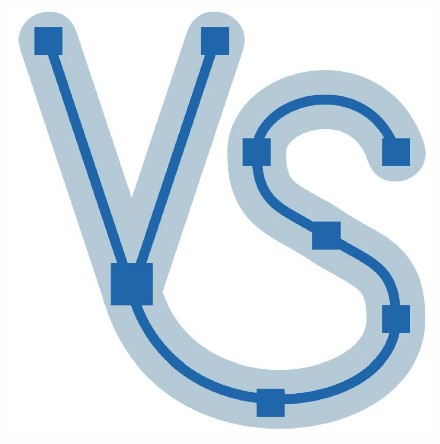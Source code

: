 \begin{titlepage}
\begin{figure}[h]
\begin{minipage}{0.2\textwidth}
\includegraphics[width=1.0\textwidth]{images/vs_logo.jpg}
\end{minipage}
\end{figure}

\end{titlepage}
